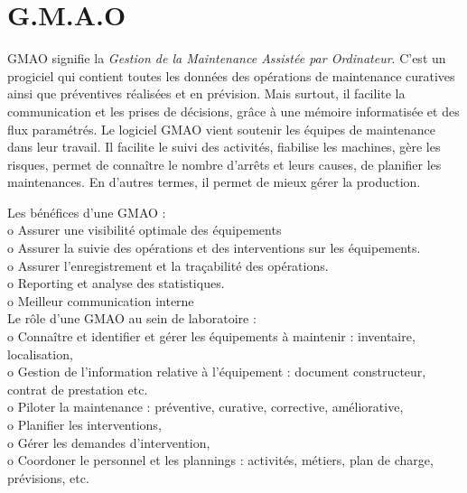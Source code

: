 \section{G.M.A.O}
GMAO signifie la \textit{Gestion de la Maintenance Assistée par Ordinateur}. C’est un progiciel qui contient toutes les données des opérations de maintenance curatives ainsi que préventives réalisées et en prévision. 
Mais surtout, il facilite la communication et les prises de décisions, grâce à une mémoire informatisée et des flux paramétrés.
Le logiciel GMAO vient soutenir les équipes de maintenance dans leur travail. 
Il facilite le suivi des activités, fiabilise les machines, gère les risques, permet de connaître le nombre d’arrêts et leurs causes, de planifier les maintenances. En d’autres termes, il permet de mieux gérer la production.

\vspace*{1cm}
Les bénéfices d’une GMAO :\\
o	Assurer une visibilité optimale des équipements\\
o	Assurer la suivie des opérations et des interventions sur les équipements.\\
o	Assurer l’enregistrement et la traçabilité des opérations.\\
o	Reporting et analyse des statistiques.\\
o	 Meilleur communication interne\\

Le rôle d’une GMAO au sein de laboratoire :\\
o	Connaître et identifier et gérer les équipements à maintenir : inventaire, localisation,\\
o	Gestion de l’information relative à l’équipement : document constructeur, contrat de prestation etc.\\
o	Piloter la maintenance : préventive, curative, corrective, améliorative,\\
o	Planifier les interventions,\\
o	Gérer les demandes d’intervention,\\
o	Coordoner le personnel et les plannings : activités, métiers, plan de charge, prévisions, etc.\\
\pagebreak